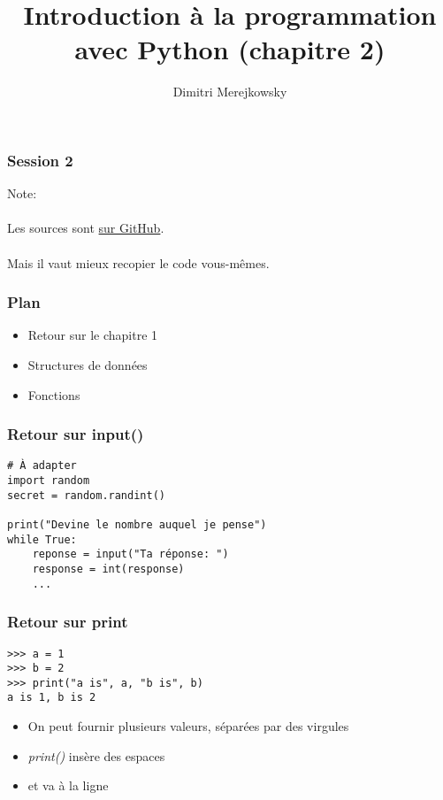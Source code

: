 \documentclass{beamer}
\title{Introduction à la programmation avec Python (chapitre 2)}
\author{Dimitri Merejkowsky}
\institute{E2L}
\begin{document}
\frame{\titlepage}

\begin{frame}

\frametitle{Session 2}

\end{frame}

\begin{frame}

Note: \\~\\


Les sources sont
\href{https://github.com/E2L/cours-python/tree/master/sources}{sur GitHub}. \\~\\


Mais il vaut mieux recopier le code vous-mêmes.

\end{frame}


\begin{frame}

\frametitle{Plan}

\begin{itemize}
  \item Retour sur le chapitre 1
  \item Structures de données
  \item Fonctions
\end{itemize}

\end{frame}

\begin{frame}[fragile]
    \frametitle{Retour sur input()}



\begin{verbatim}
# À adapter
import random
secret = random.randint()

print("Devine le nombre auquel je pense")
while True:
    reponse = input("Ta réponse: ")
    response = int(response)
    ...
\end{verbatim}

\end{frame}



\begin{frame}[fragile]
    \frametitle{Retour sur print}

\begin{verbatim}
>>> a = 1
>>> b = 2
>>> print("a is", a, "b is", b)
a is 1, b is 2
\end{verbatim}

\begin{itemize}
  \item On peut fournir plusieurs valeurs, séparées par des virgules
  \item \textit{print()} insère des espaces
  \item et va à la ligne
\end{itemize}

\end{frame}
\end{document}
